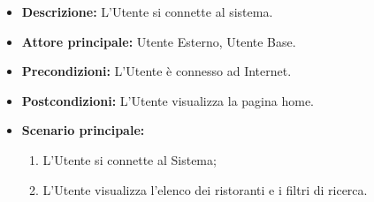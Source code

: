 \label{usecase:Homepage}
\begin{itemize}
    \item \textbf{Descrizione:} L'Utente si connette al sistema.

    \item \textbf{Attore principale:} Utente Esterno, Utente Base.

    \item \textbf{Precondizioni:} L'Utente è connesso ad Internet.

    \item \textbf{Postcondizioni:} L'Utente visualizza la pagina home.

    \item \textbf{Scenario principale:}
    \begin{enumerate}
        \item L'Utente si connette al Sistema;
        \item L'Utente visualizza l'elenco dei ristoranti e i filtri di ricerca.
    \end{enumerate}
\end{itemize}

